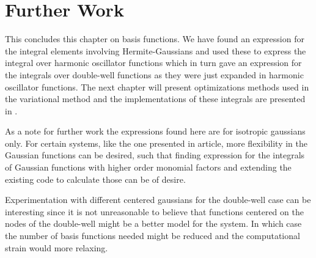 \section{Further Work}
    This concludes this chapter on basis functions. We have found an expression
    for the integral elements involving Hermite-Gaussians and used these to
    express the integral over harmonic oscillator functions which in turn gave
    an expression for the integrals over double-well functions as they were
    just expanded in harmonic oscillator functions. The next chapter will
    present optimizations methods used in the variational method and the
    implementations of these integrals are presented in .

    As a note for further work the expressions found here are for isotropic
    gaussians only. For certain systems, like the one presented in
    article\cite{nonIsoGauss}, more flexibility in the Gaussian functions can
    be desired, such that finding expression for the integrals of Gaussian
    functions with higher order monomial factors and extending the existing
    code to calculate those can be of desire.

    Experimentation with different centered gaussians for the double-well case
    can be interesting since it is not unreasonable to believe that functions
    centered on the nodes of the double-well might be a better model for the
    system. In which case the number of basis functions needed might be reduced
    and the computational strain would more relaxing.
